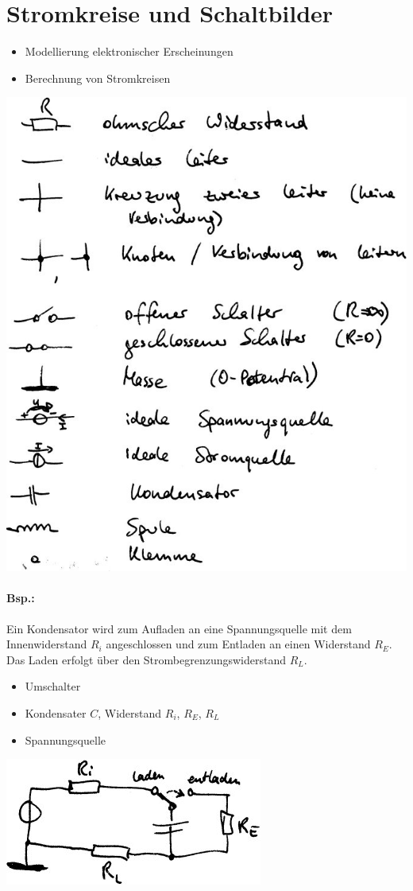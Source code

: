 \section{Stromkreise und Schaltbilder}
\begin{itemize}
\item Modellierung elektronischer Erscheinungen
\item Berechnung von Stromkreisen
\end{itemize}
\includegraphics[scale=1.5]{Abbildungen/ABB207}

\paragraph{Bsp.:} Ein Kondensator wird zum Aufladen an eine Spannungsquelle mit dem Innenwiderstand $R_i$ angeschlossen und zum Entladen an einen Widerstand $R_E$. Das Laden erfolgt über den Strombegrenzungswiderstand $R_L$.
\begin{itemize}
\item Umschalter
\item Kondensater $C$, Widerstand $R_i$, $R_E$, $R_L$
\item Spannungsquelle
\end{itemize}
\includegraphics[scale=1.5]{Abbildungen/ABB208}

